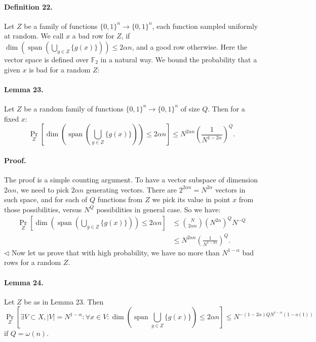 \paragraph{Definition 22.} Let $Z$ be a family of functions $\{0,1\}^n\to\{0,1\}^n$, each function sampled uniformly at random. We call $x$ a bad row for $Z$, if $\dim(\operatorname{span}(\bigcup_{g\in Z}\{g(x)\}))\leq2\alpha n$, and a good row otherwise. Here the vector space is defined over $\mathbb F_2$ in a natural way.
We bound the probability that a given $x$ is bad for a random $Z$:
\paragraph{Lemma 23.} Let $Z$ be a random family of functions $\{0,1\}^n\to\{0,1\}^n$ of size $Q$. Then for a fixed $x$:
\[\Pr_Z\left[\dim\left(\operatorname{span}\left(\bigcup_{g\in Z}\{g(x)\}\right)\right)\leq2\alpha n\right]\leq N^{2\alpha n}\left(\frac1{N^{1-2\alpha}}\right)^Q.\]
\paragraph{Proof.} The proof is a simple counting argument. To have a vector subspace of dimension $2\alpha n$, we need to pick $2\alpha n$ generating vectors. There are $2^{2\alpha n}=N^{2\alpha}$ vectors in such space, and for each of $Q$ functions from $Z$ we pick its value in point $x$ from those possibilities, versus $N^Q$ possibilities in general case. So we have:
\begin{align*}
\Pr_Z\left[\dim\left(\operatorname{span}\left(\bigcup_{g\in Z}\{g(x)\}\right)\right)\leq2\alpha n\right]
&\leq\binom N{2\alpha n}(N^{2\alpha})^QN^{-Q}\\
&\leq N^{2\alpha n}\left(\frac1{N^{1-2\alpha}}\right)^Q.
\end{align*}\hfill$\triangleleft$
Now let us prove that with high probability, we have no more than $N^{1-\alpha}$ bad rows for a random $Z$.
\paragraph{Lemma 24.} Let $Z$ be as in Lemma 23. Then
\[\Pr_Z\left[\exists V\subset X,|V|=N^{1-\alpha}:\forall x\in V:\dim\left(\operatorname{span}\bigcup_{g\in Z}\{g(x)\}\right)\leq2\alpha n\right]\leq N^{-(1-2\alpha)QN^{1-\alpha}(1-o(1))}\]
if $Q=\omega(n)$.
